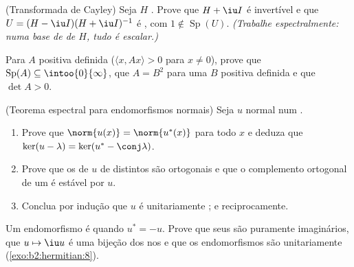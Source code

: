 \begin{exercise}[$\star\star$]\label{exo:b2:hermitian:6}
(Transformada de Cayley) Seja $H$ . Prove que $H + \iu I$ é
invertível e que $U = (H - \iu I)(H + \iu I)^{-1}$ é ,
com $1 \notin \operatorname{Sp}(U)$. \emph{(Trabalhe espectralmente: numa
base de  de $H$, tudo é escalar.)}
\end{exercise}

\begin{exercise}[$\star\star$]\label{exo:b2:hermitian:7}
Para $A$  positiva definida ($\langle x, Ax\rangle > 0$ para
$x \neq 0$), prove que $\operatorname{Sp}(A) \subseteq
\intoo{0}{\infty}$, que $A = B^2$ para uma $B$  positiva
definida e que $\det A > 0$.
\end{exercise}

\begin{exercise}[$\star\star\star$]\label{exo:b2:hermitian:8}
(Teorema espectral para endomorfismos normais) Seja $u$ normal num
.
\begin{enumerate}
  \item Prove que $\norm{u(x)} = \norm{u^*(x)}$ para todo $x$ e deduza que
        $\ker(u - \lambda) = \ker(u^* - \conj\lambda)$.
  \item Prove que os  de $u$ de  distintos são
        ortogonais e que o complemento ortogonal de um
         é estável por $u$.
  \item Conclua por indução que $u$ é unitariamente ;
        e reciprocamente.
\end{enumerate}
\end{exercise}

\begin{exercise}[$\star$]\label{exo:b2:hermitian:9}
Um endomorfismo é \emph{} quando $u^* = -u$. Prove
que seus  são puramente imaginários, que $u \mapsto \iu
u$ é uma bijeção dos  nos
 e que os endomorfismos  são
unitariamente  (\cref{exo:b2:hermitian:8}).
\end{exercise}

